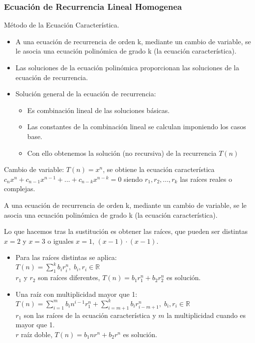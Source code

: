 \subsubsection{Ecuación de Recurrencia Lineal Homogenea}
Método de la Ecuación Característica.
\begin{itemize}
  \item A una ecuación de recurrencia de orden k, mediante un cambio de variable, se le asocia una ecuación polinómica de grado k (la ecuación característica).
  \item Las soluciones de la ecuación polinómica proporcionan las soluciones de la ecuación de recurrencia.
  \item Solución general de la ecuación de recurrencia:
  \begin{itemize}
    \item Es combinación lineal de las soluciones básicas.
    \item Las constantes de la combinación lineal se calculan imponiendo los casos base.
    \item Con ello obtenemos la solución (no recursiva) de la recurrencia $T(n)$
  \end{itemize}

\end{itemize}

Cambio de variable: $T(n)= x^n$, se obtiene la ecuación característica $c_n x^n+ c_{n-1}x^{n-1}+ ... + c_{n-k}x^{n-k} = 0$ siendo $r_1, r_2, ..., r_k$ las raíces reales o complejas.

A una ecuación de recurrencia de orden k, mediante un cambio de variable, se le asocia una ecuación polinómica de grado k (la ecuación característica).

Lo que hacemos tras la sustitución es obtener las raíces, que pueden ser distintas $x=2$ y $x=3$ o iguales $x=1$, $(x-1) \cdot (x-1)$.
\begin{itemize}
  \item Para las raíces distintas se aplica: \\ 
  $T(n) = \sum _1 ^k b_i r_i^n, \; b_i, r_i \in \mathbb{R}$ \\
  $r_1$ y $r_2$ son raíces diferentes, $T(n)=b_1r_1^n+b_2r_2^n$ es solución.
  \item Una raíz con multiplicidad mayor que 1: \\ 
  $T(n) = \sum _{i=1} ^m b_i n^{i-1}r_1^n+\sum _{i=m+1} ^k b_i r_{i-m+1}^n, \; b_i, r_i \in \mathbb{R}$ \\ 
  $r_1$ son las raíces de la ecuación característica y $m$ la multiplicidad cuando es mayor que 1.\\
  $r$  raíz doble, $T(n)=b_1nr^n+b_2r^n$ es solución.
\end{itemize}

